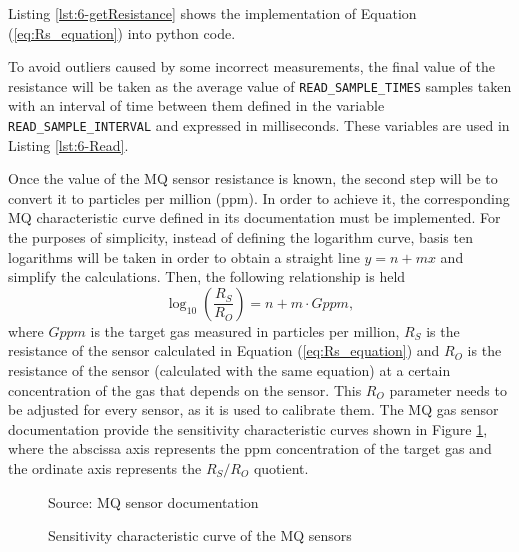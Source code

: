Listing \ref{lst:6-getResistance} shows the implementation of Equation (\ref{eq:Rs_equation}) into python code.


To avoid outliers caused by some incorrect measurements, the final value of the resistance will be taken as the average value of \texttt{READ\_SAMPLE\_TIMES} samples taken with an interval of time between them defined in the variable \texttt{READ\_SAMPLE\_INTERVAL} and expressed in milliseconds. These variables are used in Listing \ref{lst:6-Read}.

Once the value of the MQ sensor resistance is known, the second step will be to convert it to particles per million (ppm). In order to achieve it, the corresponding MQ characteristic curve defined in its documentation must be implemented. For the purposes of simplicity, instead of defining the logarithm curve, basis ten logarithms will be taken in order to obtain a straight line $y=n+mx$ and simplify the calculations. Then, the following relationship is held
\begin{equation*} \label{eq:ppm_equation}
\log _{ 10 }{ \left( \frac{{R}_{S}}{{R}_{O}} \right)} =n+m\cdot Gppm,
\end{equation*}
where $Gppm$ is the target gas measured in particles per million, ${R}_{S}$ is the resistance of the sensor calculated in Equation (\ref{eq:Rs_equation}) and ${R}_{O}$ is the resistance of the sensor (calculated with the same equation) at a certain concentration of the gas that depends on the sensor. This ${R}_{O}$ parameter needs to be adjusted for every sensor, as it is used to calibrate them. The MQ gas sensor documentation provide the sensitivity characteristic curves shown in Figure \ref{fig:6-MQ_curve}, where the abscissa axis represents the ppm concentration of the target gas and the ordinate axis represents the ${R}_{S}/{R}_{O}$ quotient.

\begin{figure}[htb]
	\centering
	\caption{Sensitivity characteristic curve of the MQ sensors}
	\label{fig:6-MQ_curve}{Source: MQ sensor documentation \cite{MQ7,MQ2}}
\end{figure}

